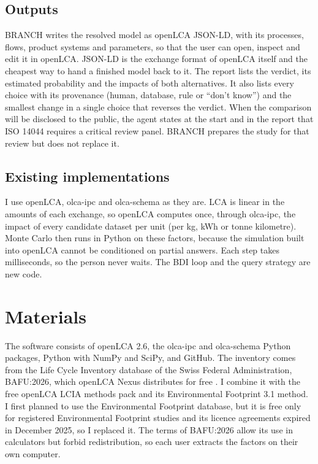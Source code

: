 \documentclass{article}
\begin{document}
\subsection{Outputs}
BRANCH writes the resolved model as openLCA JSON-LD, with its processes, flows, product systems and
parameters, so that the user can open, inspect and edit it in openLCA. JSON-LD is the exchange format of
openLCA itself and the cheapest way to hand a finished model back to it. The report lists the verdict, its estimated probability and the impacts of
both alternatives. It also lists every choice with its provenance (human, database, rule or ``don't
know'') and the smallest change in a single choice that reverses the verdict. When the comparison will be
disclosed to the public, the agent states at the start and in the report that ISO 14044 requires a
critical review panel. BRANCH prepares the study for that review but does not replace it.

\subsection{Existing implementations}
I use openLCA, olca-ipc and olca-schema as they are. LCA is linear in the amounts of each exchange, so
openLCA computes once, through olca-ipc, the impact of every candidate dataset per unit (per kg, kWh or
tonne kilometre). Monte Carlo then runs in Python on these factors, because the simulation built into
openLCA cannot be conditioned on partial answers. Each step takes milliseconds, so the person never waits.
The BDI loop and the query strategy are new code.

\section{Materials}
The software consists of openLCA 2.6, the olca-ipc and olca-schema Python packages, Python with NumPy
and SciPy, and GitHub. The inventory comes from the Life Cycle Inventory database of the Swiss Federal Administration,
BAFU:2026, which openLCA Nexus distributes for free \citep{bafu2026}. I combine it with the free openLCA
LCIA methods pack and its Environmental Footprint 3.1 method. I first planned to use the Environmental
Footprint database, but it is free only for registered Environmental Footprint studies and its licence
agreements expired in December 2025, so I replaced it. The terms of BAFU:2026 allow its use in calculators
but forbid redistribution, so each user extracts the factors on their own computer.
\end{document}
